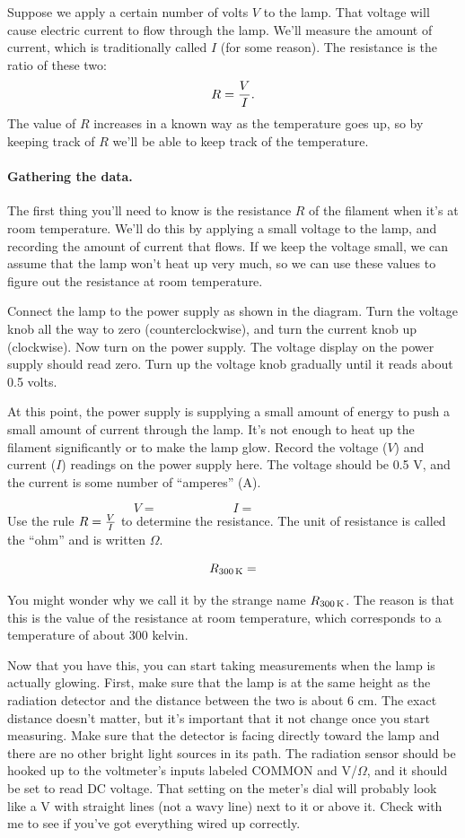 Suppose we apply a certain number of volts $V$ to the lamp. That voltage
will cause electric current to flow through the lamp. We'll measure
the amount of current, which is traditionally called $I$ (for some reason). 
The resistance is the ratio of these two:
$$
R = {V\over I}.
$$
The value of $R$ increases in a known way as the temperature goes
up, so by keeping track of $R$ we'll be able to keep track of the
temperature.


\paragraph{Gathering the data.}
The first thing you'll need to know is the resistance $R$ of the filament
when it's at room temperature. We'll do this by applying a small voltage
to the lamp, and recording the amount of current that flows. If we keep
the voltage small, we can assume that the lamp won't heat up very much,
so we can use these values to figure out the resistance at 
room temperature.

Connect the lamp to the power supply as shown in the diagram.
Turn the voltage knob all the way to zero (counterclockwise), and turn
the current knob up (clockwise). Now turn on the power supply.
The voltage display on the power supply should read zero. Turn up the voltage
knob gradually until it reads about 0.5 volts.

At this point, the power supply is supplying a small amount of energy to push
a small amount of current through the lamp. It's not enough to heat up
the filament significantly or to make the lamp glow. 
Record the voltage ($V$) and current ($I$) readings on the power supply here. The voltage 
should be 0.5 V, and the current is some number of ``amperes'' (A).

\vskip 0.5in
$$
V=\qquad\qquad\qquad
I = \qquad\qquad\qquad\ 
$$
\vskip 0.5in
Use the rule $R={V\over I}$ to determine the resistance. 
The unit of resistance is called the ``ohm'' and is written $\Omega$.

\vskip 0.5in
$$
R_{300\,{\rm K}}=
$$
\vskip 0.5in

You might wonder why we call it by the strange name $R_{300\,{\rm K}}$.
The reason is that this is the value of the resistance at room temperature, 
which corresponds to a 
temperature of about 300 kelvin. 

Now that you have this, you can start taking measurements when the lamp
is actually glowing. First, make sure that the lamp is at the same height
as the radiation detector and the distance between the two is about 6 cm.
The exact distance doesn't matter, but it's important that it not 
change once you start measuring. Make sure that the detector is facing
directly toward the lamp and there are no other bright light sources
in its path. The radiation sensor should be hooked up to the
voltmeter's inputs labeled COMMON and V/$\Omega$, and it should 
be set to read DC voltage. That setting on the meter's dial will
probably look like a V with straight lines (not a wavy line) 
next to it or above it.
Check with me to see if you've got everything wired up correctly.


